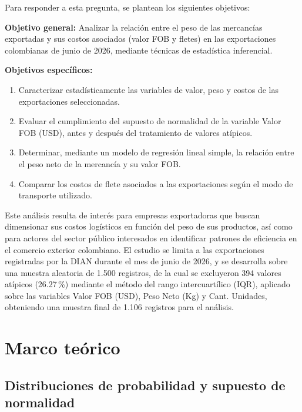 \documentclass[12pt]{article}
\begin{document}
Para responder a esta pregunta, se plantean los siguientes objetivos:

\textbf{Objetivo general:} Analizar la relación entre el peso de las
mercancías exportadas y sus costos asociados (valor FOB y fletes) en
las exportaciones colombianas de junio de 2026, mediante técnicas de
estadística inferencial.

\textbf{Objetivos específicos:}
\begin{enumerate}
    \item Caracterizar estadísticamente las variables de valor, peso y
    costos de las exportaciones seleccionadas.
    \item Evaluar el cumplimiento del supuesto de normalidad de la
    variable Valor FOB (USD), antes y después del tratamiento de
    valores atípicos.
    \item Determinar, mediante un modelo de regresión lineal simple, la
    relación entre el peso neto de la mercancía y su valor FOB.
    \item Comparar los costos de flete asociados a las exportaciones
    según el modo de transporte utilizado.
\end{enumerate}

Este análisis resulta de interés para empresas exportadoras que buscan
dimensionar sus costos logísticos en función del peso de sus productos,
así como para actores del sector público interesados en identificar
patrones de eficiencia en el comercio exterior colombiano. El estudio
se limita a las exportaciones registradas por la DIAN durante el mes de
junio de 2026, y se desarrolla sobre una muestra aleatoria de 1.500
registros, de la cual se excluyeron 394 valores atípicos (26.27\,\%)
mediante el método del rango intercuartílico (IQR), aplicado sobre las
variables Valor FOB (USD), Peso Neto (Kg) y Cant. Unidades, obteniendo
una muestra final de 1.106 registros para el análisis.

\section{Marco teórico}

\subsection*{Distribuciones de probabilidad y supuesto de normalidad}
\end{document}
